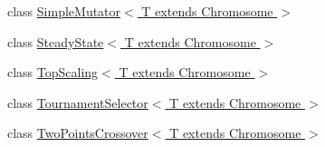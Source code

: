 \begin{DoxyCompactItemize}
\item 
class \hyperlink{classjenes_1_1stage_1_1operator_1_1common_1_1_simple_mutator_3_01_t_01extends_01_chromosome_01_4}{Simple\-Mutator$<$ T extends Chromosome $>$}
\item 
class \hyperlink{classjenes_1_1stage_1_1operator_1_1common_1_1_steady_state_3_01_t_01extends_01_chromosome_01_4}{Steady\-State$<$ T extends Chromosome $>$}
\item 
class \hyperlink{classjenes_1_1stage_1_1operator_1_1common_1_1_top_scaling_3_01_t_01extends_01_chromosome_01_4}{Top\-Scaling$<$ T extends Chromosome $>$}
\item 
class \hyperlink{classjenes_1_1stage_1_1operator_1_1common_1_1_tournament_selector_3_01_t_01extends_01_chromosome_01_4}{Tournament\-Selector$<$ T extends Chromosome $>$}
\item 
class \hyperlink{classjenes_1_1stage_1_1operator_1_1common_1_1_two_points_crossover_3_01_t_01extends_01_chromosome_01_4}{Two\-Points\-Crossover$<$ T extends Chromosome $>$}
\end{DoxyCompactItemize}
